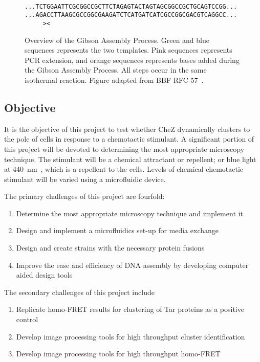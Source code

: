 \documentclass[../main.tex]{subfiles}
\begin{document}
\begin{figure}[p]
{{\\
\texttt{\color{DarkGreen}...TCTGGAATTCGCGGCCGCTTCTAGAG\color{RubineRed}TACTAGTAGCGGCCGC\color{YellowOrange}TGCAGTC\color{DarkBlue}CGG...}
\\
\texttt{\color{DarkGreen}...AGA\color{YellowOrange}CCTTAAG\color{RubineRed}CGCCGGCGAAGATCTC\color{DarkBlue}ATGATCATCGCCGGCGACGTCAGGCC...}
\\
\texttt{\color{black}\ \ \ \ \ ><\ \ \ }
}
\label{fig:gibson:5}
}
\caption[Overview of the Gibson Assembly Process]{Overview of the Gibson Assembly Process. Green and blue sequences  represents the two templates. Pink sequences represents PCR extension, and orange sequences represents bases added during the Gibson Assembly Process. All steps occur in the same isothermal reaction. Figure adapted from BBF RFC 57~\citep{rfc57}.}
\label{fig:gibson}
\end{figure}

\subsection{Objective}
It is the objective of this project to test whether CheZ dynamically clusters to the pole of \ecoli cells in response to a chemotactic stimulant. A significant portion of this project will be devoted to determining the most appropriate microscopy technique. The stimulant will be a chemical attractant or repellent; or blue light at \SI{440}{\nano\meter}~\citep{wright06}, which is a repellent to the cells. Levels of chemical chemotactic stimulant will be varied using a microfluidic device.

The primary challenges of this project are fourfold:
\begin{enumerate}
\item Determine the most appropriate microscopy technique and implement it
\item Design and implement a microfluidics set-up for media exchange
\item Design and create \ecoli strains with the necessary protein fusions
\item Improve the ease and efficiency of DNA assembly by developing computer aided design tools
\end{enumerate}

The secondary challenges of this project include
\begin{enumerate}
\item Replicate homo-FRET results for clustering of Tar proteins as a positive control
\item Develop image processing tools for high throughput cluster identification
\item Develop image processing tools for high throughput homo-FRET
\end{enumerate}
\end{document}

